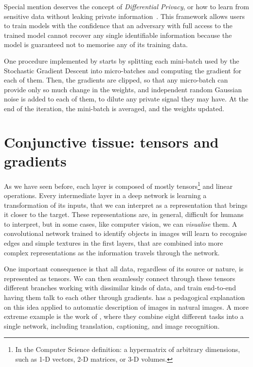 Special mention deserves the concept of \emph{Differential Privacy}, 
or how to learn from sensitive data without leaking private information~\citep{differential_privacy}.
This framework allows users to train models with the confidence that an adversary with full access to the trained model cannot recover any single identifiable information because the model is guaranteed not to memorise any of its training data.

One procedure implemented by \citet{tf_privacy} starts by splitting each mini-batch used by the Stochastic Gradient Descent into micro-batches and computing the gradient for each of them.
Then, the gradients are clipped, so that any micro-batch can provide only so much change in the weights, and independent random Gaussian noise is added to each of them, to dilute any private signal they may have.
At the end of the iteration, the mini-batch is averaged, and the weights updated.


\section[Tensors and gradients]{Conjunctive tissue: tensors and gradients}\label{sec:tensors}
As we have seen before, each layer is composed of mostly tensors\footnote{In the Computer Science definition: a hypermatrix of arbitrary dimensions, such as 1-D vectors, 2-D matrices, or 3-D volumes.} and linear operations.
Every intermediate layer in a deep network is learning a transformation of its inputs, that we can interpret as a representation that brings it closer to the target.
These representations are, in general, difficult for humans to interpret, but in some cases, like computer vision, we can \emph{visualise} them.
A convolutional network trained to identify objects in images will learn to recognise edges and simple textures in the first layers, that are combined into more complex representations as the information travels through the network.

One important consequence is that all data, regardless of its source or nature, is represented as tensors.
We can then seamlessly connect through these tensors different branches working with dissimilar kinds of data, and train end-to-end having them talk to each other through gradients.
\citet{tensors_and_gradients} has a pedagogical explanation on this idea applied to automatic description of images in natural images.
A more extreme example is the work of \citet{one_rule_all}, where they combine eight different tasks into a single network, including translation, captioning, and image recognition.


